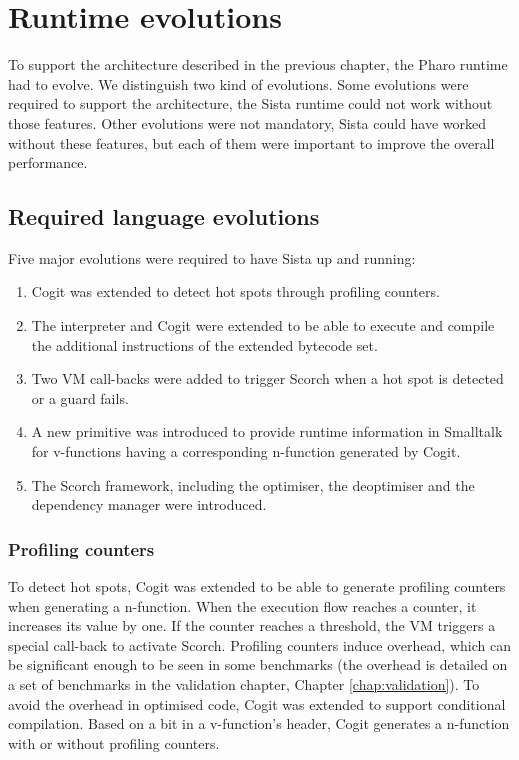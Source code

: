\documentclass[a4paper,12pt,twoside]{../includes/ThesisStyle}
\begin{document}
\fi

\chapter{Runtime evolutions}
\label{chap:runtimeEvolution}
\minitoc

To support the architecture described in the previous chapter, the Pharo runtime had to evolve. We distinguish two kind of evolutions. Some evolutions were required to support the architecture, the Sista runtime could not work without those features. Other evolutions were not mandatory, Sista could have worked without these features, but each of them were important to improve the overall performance.


\section{Required language evolutions}

Five major evolutions were required to have Sista up and running:
\begin{enumerate}
	\item Cogit was extended to detect hot spots through profiling counters.
	\item The interpreter and Cogit were extended to be able to execute and compile the additional instructions of the extended bytecode set.
	\item Two VM call-backs were added to trigger Scorch when a hot spot is detected or a guard fails.
	\item A new primitive was introduced to provide runtime information in Smalltalk for v-functions having a corresponding n-function generated by Cogit.
	\item The Scorch framework, including the optimiser, the deoptimiser and the dependency manager were introduced.
\end{enumerate}

\subsection{Profiling counters}

To detect hot spots, Cogit was extended to be able to generate profiling counters when generating a n-function. When the execution flow reaches a counter, it increases its value by one. If the counter reaches a threshold, the VM triggers a special call-back to activate Scorch. Profiling counters induce overhead, which can be significant enough to be seen in some benchmarks (the overhead is detailed on a set of benchmarks in the validation chapter, Chapter \ref{chap:validation}). To avoid the overhead in optimised code, Cogit was extended to support conditional compilation. Based on a bit in a v-function's header, Cogit generates a n-function with or without profiling counters.
\end{document}
